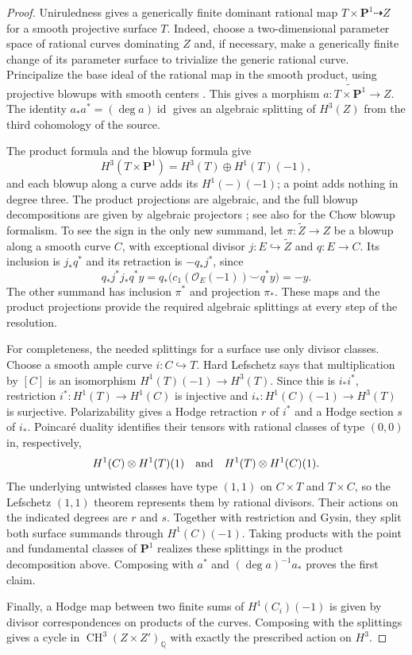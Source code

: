 \documentclass[11pt]{amsart}
\newcommand{\Q}{\mathbb Q}
\newcommand{\PP}{\mathbf P}
\DeclareMathOperator{\CH}{CH}
\DeclareMathOperator{\id}{id}
\theoremstyle{definition}
\theoremstyle{remark}
\numberwithin{equation}{section}
\begin{document}
\begin{proof}
Uniruledness gives a generically finite dominant rational map
$T\times\PP^1\dashrightarrow Z$ for a smooth projective surface $T$.
Indeed, choose a two-dimensional parameter space of rational curves
dominating $Z$ and, if necessary, make a generically finite change of its
parameter surface to trivialize the generic rational curve.  Principalize
the base ideal of the rational map in the smooth product, using
projective blowups with smooth centers
\cite[Theorem~1.0.1]{Wlodarczyk}.  This gives a morphism
$a:\widetilde{T\times\PP^1}\to Z$.  The identity
$a_*a^*=(\deg a)\id$ gives an algebraic splitting of $H^3(Z)$ from the
third cohomology of the source.

The product formula and the blowup formula give
\[
 H^3(T\times\PP^1)=H^3(T)\oplus H^1(T)(-1),
\]
and each blowup along a curve adds its $H^1(-)(-1)$; a point adds nothing
in degree three.  The product projections are algebraic, and the full
blowup decompositions are given by algebraic projectors
\cite[Appendix~A, equation~(9) and Proposition~A.1]{LiBlowup};
see also \cite[Section~6.7]{Fulton} for the Chow blowup formalism.
To see the sign in the only new summand,
let $\pi:\widetilde Z\to Z$ be a blowup along a smooth curve $C$,
with exceptional divisor $j:E\hookrightarrow\widetilde Z$ and
$q:E\to C$.  Its inclusion is $j_*q^*$ and its retraction is
$-q_*j^*$, since
\[
 q_*j^*j_*q^*y
 =q_*\bigl(c_1(\mathcal O_E(-1))\smile q^*y\bigr)=-y.
\]
The other summand has inclusion $\pi^*$ and projection $\pi_*$.
These maps and the product projections provide the required algebraic
splittings at every step of the resolution.

For completeness, the needed splittings for a surface use only divisor
classes.  Choose a smooth ample curve $i:C\hookrightarrow T$.
Hard Lefschetz says that multiplication by $[C]$ is an isomorphism
$H^1(T)(-1)\to H^3(T)$.  Since this is $i_*i^*$, restriction
$i^*:H^1(T)\to H^1(C)$ is injective and
$i_*:H^1(C)(-1)\to H^3(T)$ is surjective.
Polarizability gives a Hodge retraction $r$ of $i^*$ and a Hodge section
$s$ of $i_*$.  Poincar\'e duality identifies their tensors with rational
classes of type $(0,0)$ in, respectively,
\[
 H^1(C)\otimes H^1(T)(1)
 \quad\hbox{and}\quad
 H^1(T)\otimes H^1(C)(1).
\]
The underlying untwisted classes have type $(1,1)$ on $C\times T$ and
$T\times C$, so the Lefschetz $(1,1)$ theorem represents them by rational
divisors.  Their actions on the indicated degrees are $r$ and $s$.
Together with restriction and Gysin, they split both surface summands
through $H^1(C)(-1)$.  Taking products with the point and fundamental
classes of $\PP^1$ realizes these splittings in the product decomposition
above.  Composing with $a^*$ and $(\deg a)^{-1}a_*$ proves the first claim.

Finally, a Hodge map between two finite sums of $H^1(C_i)(-1)$ is given
by divisor correspondences on products of the curves.  Composing with the
splittings gives a cycle in $\CH^3(Z\times Z')_\Q$ with exactly the
prescribed action on $H^3$.
\end{proof}
\end{document}
